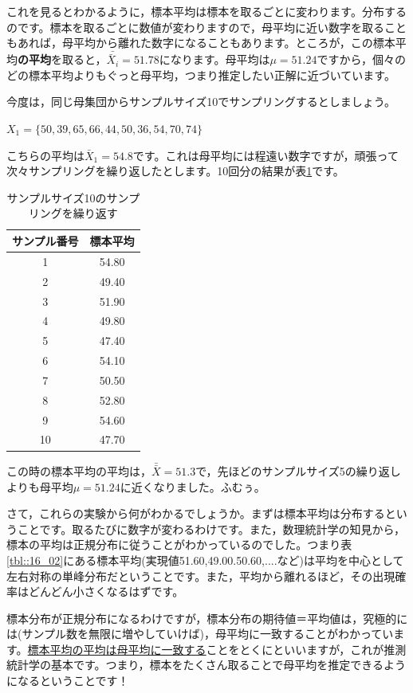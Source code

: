 \documentclass{ltjsbook}
\begin{document}
これを見るとわかるように，標本平均は標本を取るごとに変わります。分布するのです。標本を取るごとに数値が変わりますので，母平均に近い数字を取ることもあれば，母平均から離れた数字になることもあります。ところが，この標本平均\textbf{の平均}を取ると，$\bar{\bar{X}_i}=51.78$になります。母平均は$\mu=51.24$ですから，個々のどの標本平均よりもぐっと母平均，つまり推定したい正解に近づいています。

今度は，同じ母集団からサンプルサイズ10でサンプリングするとしましょう。
\begin{tcolorbox}
	$ X_1=\{50, 39, 65, 66, 44, 50, 36, 54, 70, 74\}$
\end{tcolorbox}
こちらの平均は$\bar{X}_1=54.8$です。これは母平均には程遠い数字ですが，頑張って次々サンプリングを繰り返したとします。10回分の結果が表\ref{tbl::16_03}です。

\begin{table}[ht]
	\centering
	\caption{サンプルサイズ10のサンプリングを繰り返す}
	\begin{tabular}{cc}
		\hline
		サンプル番号 & 標本平均  \\
		\hline
		1      & 54.80 \\
		2      & 49.40 \\
		3      & 51.90 \\
		4      & 49.80 \\
		5      & 47.40 \\
		6      & 54.10 \\
		7      & 50.50 \\
		8      & 52.80 \\
		9      & 54.60 \\
		10     & 47.70 \\
		\hline
	\end{tabular}
	\label{tbl::16_03}
\end{table}

この時の標本平均の平均は，$\bar{\bar{X}}=51.3$で，先ほどのサンプルサイズ5の繰り返しよりも母平均$\mu=51.24$に近くなりました。ふむぅ。

さて，これらの実験から何がわかるでしょうか。まずは標本平均は分布するということです。取るたびに数字が変わるわけです。また，数理統計学の知見から，標本の平均は正規分布に従うことがわかっているのでした。つまり表\ref{tbl::16_02}にある標本平均(実現値51.60,49.00.50.60,....など)は平均を中心として左右対称の単峰分布だということです。また，平均から離れるほど，その出現確率はどんどん小さくなるはずです。

標本分布が正規分布になるわけですが，標本分布の期待値＝平均値は，究極的には(サンプル数を無限に増やしていけば)，母平均に一致することがわかっています。\underline{標本平均の平均は母平均に一致する}ことをとくにといいますが，これが推測統計学の基本です。つまり，標本をたくさん取ることで母平均を推定できるようになるということです！
\end{document}
